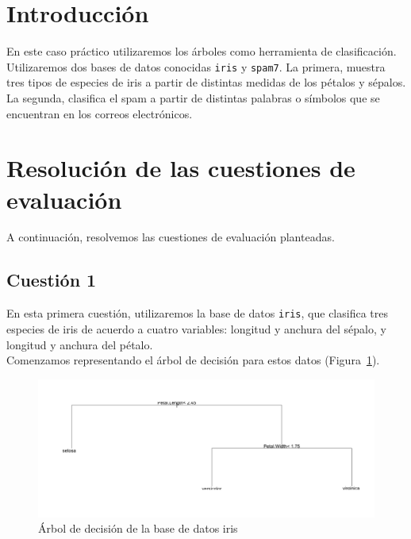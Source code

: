 \documentclass[12pt,a4paper,twoside,openright,titlepage,final]{article}
\author{José Ignacio Escribano}
\title{}
\begin{document}
\setcounter{page}{1}


\listoffigures
\thispagestyle{empty}
\newpage

\tableofcontents
\thispagestyle{empty}
\newpage


\setcounter{page}{1}

\section{Introducción}

En este caso práctico utilizaremos los árboles como herramienta de clasificación. Utilizaremos dos bases de datos conocidas \texttt{iris} y \texttt{spam7}. La primera, muestra tres tipos de especies de iris a partir de distintas medidas de los pétalos y sépalos. La segunda, clasifica el spam a partir de distintas palabras o símbolos que se encuentran en los correos electrónicos.

\section{Resolución de las cuestiones de evaluación}

A continuación, resolvemos las cuestiones de evaluación planteadas.

\subsection{Cuestión 1}

En esta primera cuestión, utilizaremos la base de datos \texttt{iris}, que clasifica tres especies de iris de acuerdo a cuatro variables: longitud y anchura del sépalo, y longitud y anchura del pétalo.\\

Comenzamos representando el árbol de decisión para estos datos (Figura~\ref{fig:iris_sin_podar}).\\

\begin{figure}[tbph!]
\centering
\includegraphics[width=0.9\linewidth]{imagenes/iris_sin_podar}
\caption{Árbol de decisión de la base de datos iris}
\label{fig:iris_sin_podar}
\end{figure}
\end{document}
